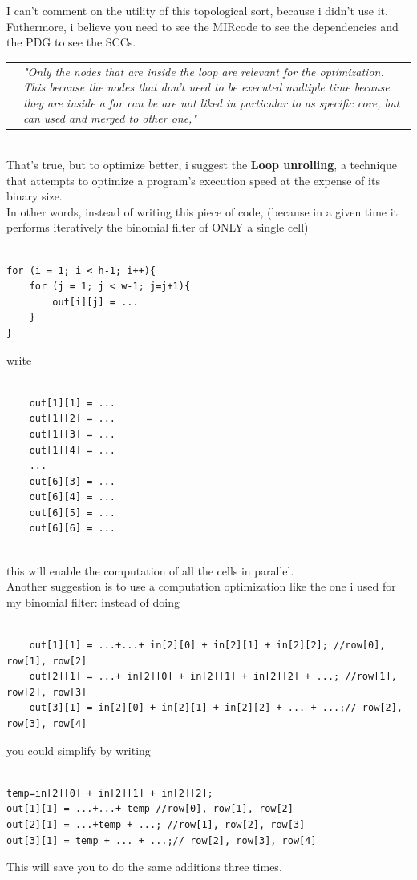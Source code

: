 I can't comment on the utility of this topological sort, because i didn't use it. Futhermore, i believe you need to see the MIRcode to see the dependencies and the PDG to see the SCCs.\\

   \begin{tabular}{ p{0.2cm} p{13.3cm}}
&\textit{"Only the nodes that are inside the loop are relevant for the optimization. This because the nodes that don't need to be executed multiple time because they are inside a for can be are not liked in particular to as specific core, but can used and merged to other one,"}
\end{tabular}\\

That's true, but to optimize better, i suggest the \textbf{Loop unrolling}, a technique that attempts to optimize a program's execution speed at the expense of its binary size.\\
In other words, instead of writing this piece of code, (because in a given time it performs iteratively the binomial filter of ONLY a single cell)
\begin{lstlisting}[frame=single]  % Start your 

for (i = 1; i < h-1; i++){
	for (j = 1; j < w-1; j=j+1){
		out[i][j] = ...
	}
}
\end{lstlisting}

write 

\begin{lstlisting}[frame=single]  % Start your 

	out[1][1] = ...
	out[1][2] = ...
	out[1][3] = ...
	out[1][4] = ...
	...
	out[6][3] = ...
	out[6][4] = ...
	out[6][5] = ...
	out[6][6] = ...
	
\end{lstlisting}
this will enable the computation of all the cells in parallel.\\
Another suggestion is to use a computation optimization like the one i used for my binomial filter: instead of doing 


\begin{lstlisting}[frame=single]  % Start your 

	out[1][1] = ...+...+ in[2][0] + in[2][1] + in[2][2]; //row[0], row[1], row[2]
	out[2][1] = ...+ in[2][0] + in[2][1] + in[2][2] + ...; //row[1], row[2], row[3]
	out[3][1] = in[2][0] + in[2][1] + in[2][2] + ... + ...;// row[2], row[3], row[4]

\end{lstlisting}
you could simplify by writing
\begin{lstlisting}[frame=single]  % Start your 

temp=in[2][0] + in[2][1] + in[2][2];
out[1][1] = ...+...+ temp //row[0], row[1], row[2]
out[2][1] = ...+temp + ...; //row[1], row[2], row[3]
out[3][1] = temp + ... + ...;// row[2], row[3], row[4]

\end{lstlisting}
This will save you to do the same additions three times.

